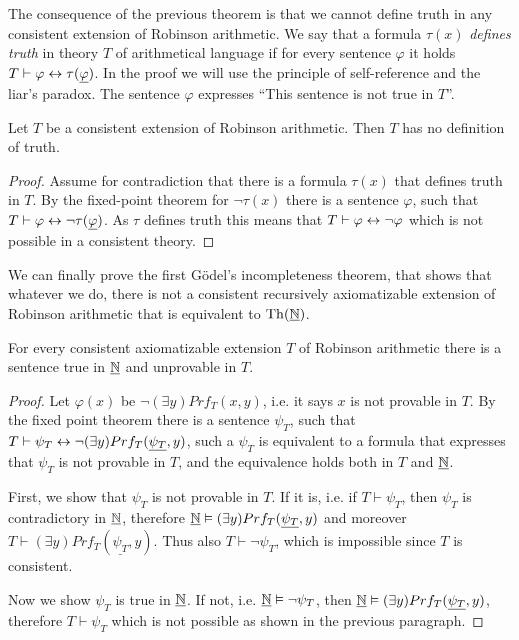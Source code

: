 The consequence of the previous theorem is that we cannot define truth in any consistent extension of Robinson arithmetic. We say that a formula $\tau(x)$ \emph{defines truth} in theory $T$ of arithmetical language if for every sentence $\varphi$ it holds $T \vdash \varphi \leftrightarrow \tau(\underline{\varphi})$. In the proof we will use the principle of self-reference and the liar's paradox. The sentence $\varphi$ expresses ``This sentence is not true in $T$''. 

\begin{theorem}
Let $T$ be a consistent extension of Robinson arithmetic. Then $T$ has no definition of truth. 
\end{theorem}
\begin{proof}
Assume for contradiction that there is a formula $\tau(x)$ that defines truth in $T$. By the fixed-point theorem for $\neg \tau(x)$ there is a sentence $\varphi$, such that $T \vdash \varphi \leftrightarrow \neg \tau(\underline{\varphi})$. As $\tau$ defines truth this means that $T \vdash \varphi \leftrightarrow \neg \varphi$ which is not possible in a consistent theory.
\end{proof}

We can finally prove the first Gödel's incompleteness theorem, that shows that whatever we do, there is not a consistent recursively axiomatizable extension of Robinson arithmetic that is equivalent to $\operatorname{Th}(\underline{\mathbb{N}})$.

\begin{theorem}
For every consistent axiomatizable extension $T$ of Robinson arithmetic there is a sentence true in $\underline{\mathbb{N}}$ and unprovable in $T$.
\end{theorem}
\begin{proof}
Let $\varphi(x)$ be $\neg (\exists y)Prf_T(x, y)$, i.e. it says $x$ is not provable in $T$. By the fixed point theorem there is a sentence $\psi_T$, such that $T \vdash \psi_T \leftrightarrow \neg (\exists y)Prf_T(\underline{\psi_T}, y)$, such a $\psi_T$ is equivalent to a formula that expresses that $\psi_T$ is not provable in $T$, and the equivalence holds both in $T$ and $\underline{\mathbb{N}}$. 

First, we show that $\psi_T$ is not provable in $T$. If it is, i.e. if $T \vdash \psi_T$, then $\psi_T$ is contradictory in $\underline{\mathbb{N}}$, therefore $\underline{\mathbb{N}} \vDash (\exists y)Prf_T(\underline{\psi_T}, y)$ and moreover $T \vdash (\exists y)Prf_T(\underline{\psi_T}, y)$. Thus also $T \vdash \neg \psi_T$, which is impossible since $T$ is consistent.

Now we show $\psi_T$ is true in $\underline{\mathbb{N}}$. If not, i.e. $\underline{\mathbb{N}} \vDash \neg \psi_T$, then $\underline{\mathbb{N}} \vDash (\exists y)Prf_T(\underline{\psi_T}, y)$, therefore $T \vdash \psi_T$ which is not possible as shown in the previous paragraph.
\end{proof}

